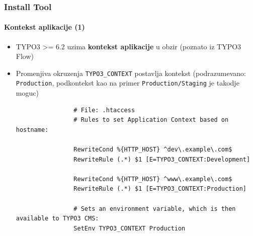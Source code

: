 
\begin{frame}[fragile]
	\frametitle{Install Tool}
	\framesubtitle{Kontekst aplikacije (1)}

	\begin{itemize}
		\item TYPO3 >= 6.2 uzima \textbf{kontekst aplikacije} u obzir\newline
			\smaller(poznato iz TYPO3 Flow)\normalsize
		\item Promenjiva okruzenja \texttt{TYPO3\_CONTEXT} postavlja kontekst\newline
			\smaller(podrazumevano: \texttt{Production}, podkontekst kao na primer \texttt{Production/Staging} je takodje moguc)\normalsize

			\begin{lstlisting}
				# File: .htaccess
				# Rules to set Application Context based on hostname:

				RewriteCond %{HTTP_HOST} ^dev\.example\.com$
				RewriteRule (.*) $1 [E=TYPO3_CONTEXT:Development]

				RewriteCond %{HTTP_HOST} ^www\.example\.com$
				RewriteRule (.*) $1 [E=TYPO3_CONTEXT:Production]

				# Sets an environment variable, which is then available to TYPO3 CMS:
				SetEnv TYPO3_CONTEXT Production
			\end{lstlisting}

	\end{itemize}

\end{frame}


